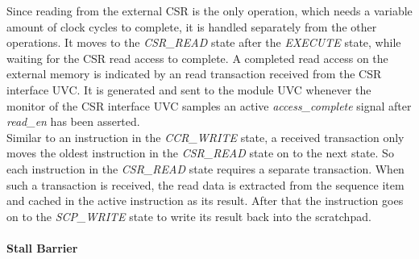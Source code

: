 Since reading from the external CSR is the only operation, which needs a variable amount of clock cycles to complete, it is handled separately from the other
operations.
It moves to the \emph{CSR\_READ} state after the \emph{EXECUTE} state, while waiting for the CSR read access to complete.
A completed read access on the external memory is indicated by an read transaction received from the CSR interface UVC.
It is generated and sent to the module UVC whenever the monitor of the CSR interface UVC samples an active \emph{access\_complete} signal after \emph{read\_en}
has been asserted.\\
Similar to an instruction in the \emph{CCR\_WRITE} state, a received transaction only moves the oldest instruction in the \emph{CSR\_READ}
state on to the next state. So each instruction in the \emph{CSR\_READ} state requires a separate transaction. 
When such a transaction is received, the read data is extracted from the sequence item and cached in the active instruction as its result.
After that the instruction goes on to the \emph{SCP\_WRITE} state to write its result back into the scratchpad.

\paragraph{Stall Barrier}\label{stall_barrier}

